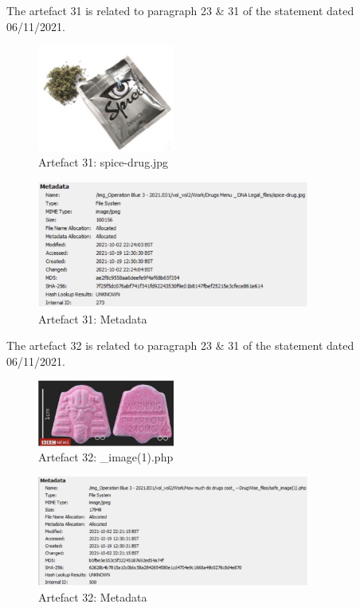 The artefact 31 is related to paragraph 23 \& 31 of the statement
dated 06/11/2021.
\begin{figure}[H]
  \centering
  \includegraphics[width=0.4\textwidth]{figures/artefact31}
  \caption{Artefact 31: spice-drug.jpg}
  \label{f:artefact31}
\end{figure}
\begin{figure}[H]
  \centering
  \includegraphics[width=0.8\textwidth]{figures/meta31}
  \caption{Artefact 31: Metadata}
  \label{f:meta31}
\end{figure}
The artefact 32 is related to paragraph 23 \& 31 of the statement
dated 06/11/2021.
\begin{figure}[H]
  \centering
  \includegraphics[width=0.4\textwidth]{figures/artefact32}
  \caption{Artefact 32: \_image(1).php}
  \label{f:artefact32}
\end{figure}
\begin{figure}[H]
  \centering
  \includegraphics[width=0.8\textwidth]{figures/meta32}
  \caption{Artefact 32: Metadata}
  \label{f:meta32}
\end{figure}
